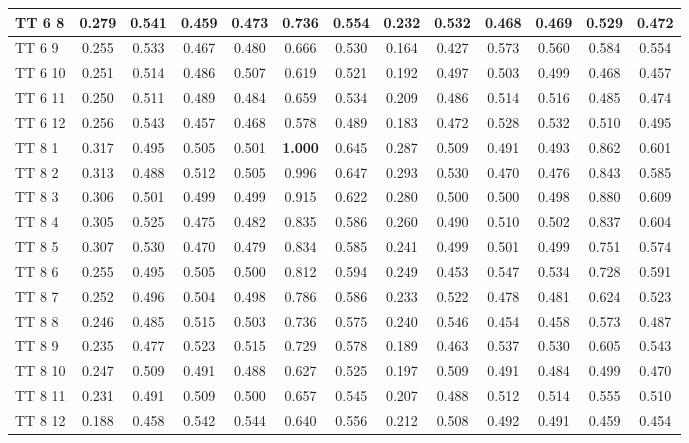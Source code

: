 \documentclass{article}
\begin{document}
\begin{tabular}{|l|c|c|c|c|c|c||c|c|c|c|c|c|}
TT  6  8 & 0.279 & 0.541 & 0.459 & 0.473 & 0.736 & 0.554 & 0.232 & 0.532 & 0.468 & 0.469 & 0.529 & 0.472\\ \hline
TT  6  9 & 0.255 & 0.533 & 0.467 & 0.480 & 0.666 & 0.530 & 0.164 & 0.427 & 0.573 & 0.560 & 0.584 & 0.554\\ \hline
TT  6 10 & 0.251 & 0.514 & 0.486 & 0.507 & 0.619 & 0.521 & 0.192 & 0.497 & 0.503 & 0.499 & 0.468 & 0.457\\ \hline
TT  6 11 & 0.250 & 0.511 & 0.489 & 0.484 & 0.659 & 0.534 & 0.209 & 0.486 & 0.514 & 0.516 & 0.485 & 0.474\\ \hline
TT  6 12 & 0.256 & 0.543 & 0.457 & 0.468 & 0.578 & 0.489 & 0.183 & 0.472 & 0.528 & 0.532 & 0.510 & 0.495\\ \hline
TT  8  1 & 0.317 & 0.495 & 0.505 & 0.501 & \textbf{1.000} & 0.645 & 0.287 & 0.509 & 0.491 & 0.493 & 0.862 & 0.601\\ \hline
TT  8  2 & 0.313 & 0.488 & 0.512 & 0.505 & 0.996 & 0.647 & 0.293 & 0.530 & 0.470 & 0.476 & 0.843 & 0.585\\ \hline
TT  8  3 & 0.306 & 0.501 & 0.499 & 0.499 & 0.915 & 0.622 & 0.280 & 0.500 & 0.500 & 0.498 & 0.880 & 0.609\\ \hline
TT  8  4 & 0.305 & 0.525 & 0.475 & 0.482 & 0.835 & 0.586 & 0.260 & 0.490 & 0.510 & 0.502 & 0.837 & 0.604\\ \hline
TT  8  5 & 0.307 & 0.530 & 0.470 & 0.479 & 0.834 & 0.585 & 0.241 & 0.499 & 0.501 & 0.499 & 0.751 & 0.574\\ \hline
TT  8  6 & 0.255 & 0.495 & 0.505 & 0.500 & 0.812 & 0.594 & 0.249 & 0.453 & 0.547 & 0.534 & 0.728 & 0.591\\ \hline
TT  8  7 & 0.252 & 0.496 & 0.504 & 0.498 & 0.786 & 0.586 & 0.233 & 0.522 & 0.478 & 0.481 & 0.624 & 0.523\\ \hline
TT  8  8 & 0.246 & 0.485 & 0.515 & 0.503 & 0.736 & 0.575 & 0.240 & 0.546 & 0.454 & 0.458 & 0.573 & 0.487\\ \hline
TT  8  9 & 0.235 & 0.477 & 0.523 & 0.515 & 0.729 & 0.578 & 0.189 & 0.463 & 0.537 & 0.530 & 0.605 & 0.543\\ \hline
TT  8 10 & 0.247 & 0.509 & 0.491 & 0.488 & 0.627 & 0.525 & 0.197 & 0.509 & 0.491 & 0.484 & 0.499 & 0.470\\ \hline
TT  8 11 & 0.231 & 0.491 & 0.509 & 0.500 & 0.657 & 0.545 & 0.207 & 0.488 & 0.512 & 0.514 & 0.555 & 0.510\\ \hline
TT  8 12 & 0.188 & 0.458 & 0.542 & 0.544 & 0.640 & 0.556 & 0.212 & 0.508 & 0.492 & 0.491 & 0.459 & 0.454\\ \hline



\end{tabular}
\end{document}
